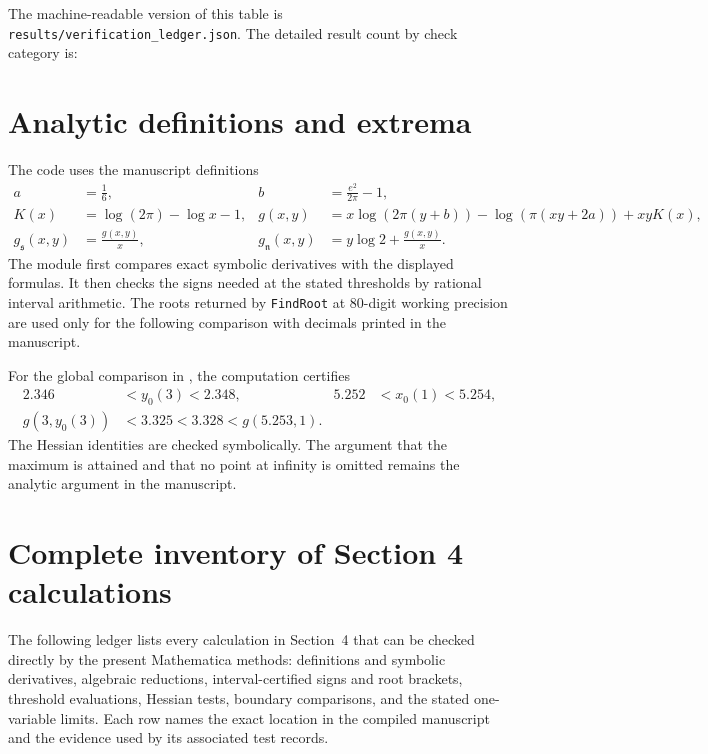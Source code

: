 \documentclass[12pt,a4paper]{amsart}
\theoremstyle{remark}
\theoremstyle{definition}
\begin{document}


The machine-readable version of this table is
\nolinkurl{results/verification_ledger.json}.  The detailed result count by
check category is:



\section{Analytic definitions and extrema}

The code uses the manuscript definitions
\begin{align*}
a&=\frac{1}{6},
&b&=\frac{e^{2}}{2\pi}-1,\\
K(x)&=\log(2\pi)-\log x-1,
&g(x,y)&=x\log(2\pi(y+b))-\log(\pi(xy+2a))+xyK(x),\\
g_{\mathfrak{s}}(x,y)&=\frac{g(x,y)}{x},
&g_{\mathfrak{n}}(x,y)&=y\log 2+\frac{g(x,y)}{x}.
\end{align*}
The module first compares exact symbolic derivatives with the displayed
formulas.  It then checks the signs needed at the stated thresholds by rational
interval arithmetic.  The roots returned by \texttt{FindRoot} at 80-digit
working precision are used only for the following comparison with decimals
printed in the manuscript.



For the global comparison in , the computation certifies
\begin{align*}
2.346&<y_{0}(3)<2.348,
&5.252&<x_{0}(1)<5.254,\\
g(3,y_{0}(3))&<3.325<3.328<g(5.253,1).
\end{align*}
The Hessian identities are checked symbolically.  The argument that the maximum
is attained and that no point at infinity is omitted remains the analytic
argument in the manuscript.

\section{Complete inventory of Section 4 calculations}

The following ledger lists every calculation in Section~4 that can be checked
directly by the present Mathematica methods: definitions and symbolic
derivatives, algebraic reductions, interval-certified signs and root brackets,
threshold evaluations, Hessian tests, boundary comparisons, and the stated
one-variable limits.  Each row names the exact location in the compiled
manuscript and the evidence used by its associated test records.
\end{document}
